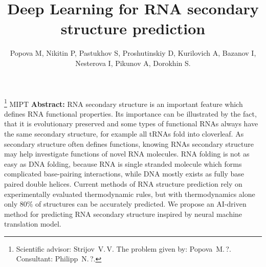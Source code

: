 \documentclass[12pt,twoside]{article}
\begin{document}
\title
{Deep Learning for RNA secondary structure prediction}
\author
[Popova M, Nikitin P, Pastukhov S, Proshutinskiy D, Kurilovich A, Bazanov I, Nesterova I, Pikunov A, Dorokhin S.] %
{Popova M, Nikitin P, Pastukhov S, Proshutinskiy D, Kurilovich A, Bazanov I, Nesterova I, Pikunov A, Dorokhin S.} %
\thanks
{Scientific advisor:  Strijov~V.\,V.
The problem given by:  Popova~M.\,?.
Consultant: Philipp~N.\,?.}
\organization
{MIPT}
\abstract
{
    \textbf{Abstract:}
        RNA secondary structure is an important feature which defines RNA functional properties. Its importance can be illustrated by the fact, that it is evolutionary preserved and some types of functional RNAs always have the same secondary structure, for example all tRNAs fold into cloverleaf. As secondary structure often defines functions, knowing RNAs secondary structure may help investigate functions of novel RNA molecules. RNA folding is not as easy as DNA folding, because RNA is single stranded molecule which forms complicated base-pairing interactions, while DNA mostly exists as fully base paired double helices. Current methods of RNA structure prediction rely on experimentally evaluated thermodynamic rules, but with thermodynamics alone only 80\% of structures can be accurately predicted. We propose an AI-driven method for predicting RNA secondary structure inspired by neural machine translation model.
}
\maketitle
\end{document}
